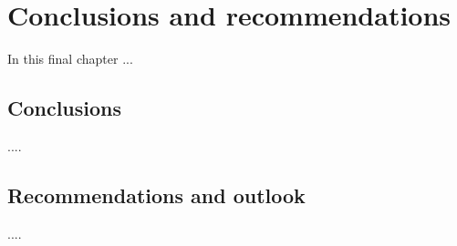 \chapter{Conclusions and recommendations}\label{ch:conclusions}

In this final chapter ...

\section{Conclusions}

....

\section{Recommendations and outlook}

....
